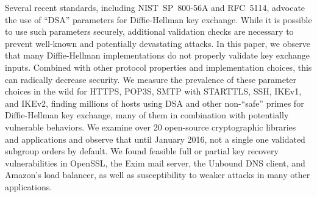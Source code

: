 \newcommand{\SubgroupPaper}{papers/subgroup/paper}
\newcommand{\SubgroupFigures}{papers/subgroup/figures}


Several recent standards, including NIST~SP~800-56A and RFC~5114, advocate the
use of ``DSA'' parameters for Diffie-Hellman key exchange.  While it is
possible to use such parameters securely, additional validation checks are
necessary to prevent well-known and potentially devastating attacks.  In this
paper, we observe that many Diffie-Hellman implementations do not properly
validate key exchange inputs. Combined with other protocol properties and
implementation choices, this can radically decrease security.
We measure the prevalence of these parameter choices in the wild
for HTTPS, POP3S, SMTP with STARTTLS, SSH, IKEv1, and IKEv2, finding millions
of hosts using DSA and other non-``safe'' primes for Diffie-Hellman key
exchange, many of them in combination with potentially vulnerable behaviors.
We examine over 20 open-source cryptographic libraries and applications and
observe that until January 2016, not a single one validated subgroup orders by
default.  We found feasible full or partial key recovery vulnerabilities in
OpenSSL, the Exim mail server, the Unbound DNS client, and Amazon's load
balancer, as well as susceptibility to weaker attacks in many other applications.








%











